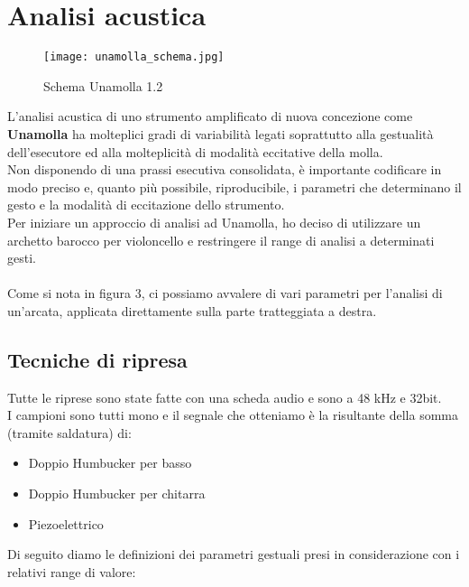 

\section{Analisi acustica}

\begin{figure}

\begin{center}

\texttt{[image: unamolla\_schema.jpg]}

\caption{Schema Unamolla 1.2}

\label{fig:03_unamolla_02}

\end{center}

\end{figure}


L’analisi acustica di uno strumento amplificato di nuova concezione come \textbf{Unamolla} ha molteplici gradi di variabilità legati soprattutto alla gestualità dell’esecutore ed alla molteplicità di modalità eccitative della molla. \\
Non disponendo di una prassi esecutiva consolidata, è importante codificare in modo preciso e, quanto più possibile, riproducibile, i parametri che determinano il gesto e la modalità di eccitazione dello strumento. \\
Per iniziare un approccio di analisi ad Unamolla, ho deciso di utilizzare un archetto barocco per violoncello e restringere il range di analisi a determinati gesti. \\
\\
Come si nota in figura 3, ci possiamo avvalere di vari parametri per l’analisi di un'arcata, applicata direttamente sulla parte tratteggiata a destra.  \\

\subsection{Tecniche di ripresa}

Tutte le riprese sono state fatte con una scheda audio e sono a 48 kHz e 32bit. \\
I campioni sono tutti mono e il segnale che otteniamo è la risultante della somma (tramite saldatura) di:
\begin{itemize}

\item{Doppio Humbucker per basso}
\item{Doppio Humbucker per chitarra}
\item{Piezoelettrico}

\end{itemize}
Di seguito diamo le definizioni dei parametri gestuali presi in considerazione con i relativi range di valore:

